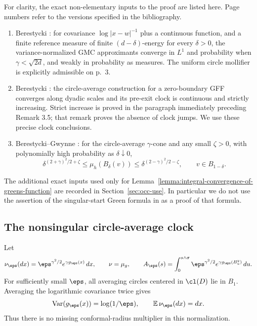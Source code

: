 For clarity, the exact non-elementary inputs to the proof are listed
here. Page numbers refer to the versions specified in the bibliography.
\begin{enumerate}[label=(\roman*)]
\item Berestycki \cite[Theorem 1.1, p.~3; hypotheses (1.2)--(1.5),
pp.~2--3]{berestycki2017elementary}: for covariance
$\log|x-w|^{-1}$ plus a continuous function, and a finite reference
measure of finite $(d-\delta)$-energy for every $\delta>0$, the
variance-normalized GMC approximants converge in $L^1$ and probability
when $\gamma<\sqrt{2d}$, and weakly in probability as measures.
The uniform circle mollifier is explicitly admissible on p.~3.
\item Berestycki \cite[Theorem 1.2, p.~949, and its proof, p.~959;
Remark 3.5, p.~959]{berestycki2015diffusion}: the circle-average construction for a
zero-boundary GFF converges along dyadic scales and its pre-exit clock
is continuous and strictly increasing. Strict increase is proved in
the paragraph immediately preceding Remark 3.5; that remark proves
the absence of clock jumps. We use these precise clock conclusions.
\item Berestycki--Gwynne \cite[Lemma A.1, p.~66, equation (A.1)]{berestycki2020random}:
for the circle-average $\gamma$-cone and any small $\zeta>0$, with
polynomially high probability as $\delta\downarrow0$,
\begin{equation}\label{eq:occ-BGmass}
 \delta^{(2+\gamma)^2/2+\zeta}
 \leq\mu_h(B_\delta(v))
 \leq\delta^{(2-\gamma)^2/2-\zeta},
 \qquad v\in B_{1-\delta}.
\end{equation}
\end{enumerate}
The additional exact inputs used only for Lemma~\ref{lemma:integral-convergence-of-greens-function} are recorded in
Section~\ref{sec:occ-use}. In particular we do not use the assertion of the
singular-start Green formula in \cite[footnote 2, p.~9]{berestycki2020random} as a proof
of that formula.

\subsection{The nonsingular circle-average clock}

Let
\[
 \nu_\eps(dx)=\eps^{\gamma^2/2}e^{\gamma g_\eps(x)}\,dx,
 \qquad \nu=\mu_g,\qquad
 A_\eps(s)=\int_0^{s\wedge\sigma}
                \eps^{\gamma^2/2}e^{\gamma g_\eps(B^y_u)}\,du.
\]
For sufficiently small $\eps$, all averaging circles centered in
$\cl(D)$ lie in $B_1$. Averaging the logarithmic covariance twice gives
\begin{equation}\label{eq:occ-var}
 \operatorname{Var}(g_\eps(x))=\log(1/\eps),\qquad
 \mathbb{E}\,\nu_\eps(dx)=dx.
\end{equation}
Thus there is no missing conformal-radius multiplier in this
normalization.

